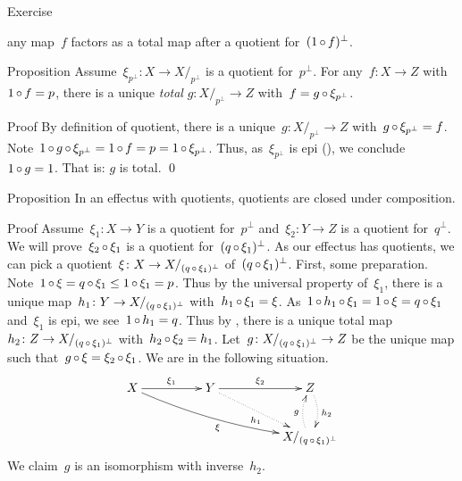 \documentclass[b]{subfiles}
\begin{document}
\begin{parsec}
\begin{point}{Exercise}
\begin{point}
    any map~$f$ factors as a total map after a quotient
    for~$(1\mathop{\circ} f)^\perp$.
\end{point}
\end{point}
\begin{point}{Proposition}%
Assume~$\xi_{p^\perp} \colon X \to X/_{p^\perp}$ is a quotient for~$p^\perp$.
For any~$f\colon X \to Z$
    with~$1 \mathop{\circ} f = p$,
    there is a unique \emph{total} $g\colon X/_{p^\perp} \to Z$
    with~$f = g \mathop{\circ} \xi_{p^\perp}$.
\begin{point}{Proof}%
By definition of quotient, there is a unique~$g\colon X/_{p^\perp} \to Z$
    with~$g \mathop{\circ} \xi_{p^\perp} = f$.
Note~$1 \mathop{\circ} g \mathop{\circ} \xi_{p^\perp} = 1 \mathop{\circ} f = p = 1 \mathop{\circ} \xi_{p^\perp}$.
Thus, as~$\xi_{p^\perp}$ is epi (),
    we conclude~$1 \mathop{\circ} g = 1$.
That is: $g$ is total. \qed
\end{point}
\end{point}
\begin{point}{Proposition}%
In an effectus with quotients,
    quotients are closed under composition.
\begin{point}{Proof}%
Assume~$\xi_1\colon X \to Y$ is a quotient for~$p^\perp$
    and~$\xi_2\colon Y \to Z$ is a quotient for~$q^\perp$.
We will prove~$\xi_2 \mathop{\circ} \xi_1$
    is a quotient for~$(q \mathop{\circ} \xi_1)^\perp$.
As our effectus has quotients,
    we can pick a quotient~$\xi \colon X \to X/_{(q \mathop{\circ} \xi_1)^\perp}$
        of~$(q \mathop{\circ} \xi_1)^\perp$.
First, some preparation.
Note~$1 \mathop{\circ} \xi = q \mathop{\circ} \xi_1 \leq 1 \mathop{\circ} \xi_1 = p$.
Thus by the universal property of~$\xi_1$,
there is a unique map~$h_1\colon Y \to X/_{(q \mathop{\circ} \xi_1)^\perp}$
        with~$h_1 \mathop{\circ} \xi_1 = \xi$.
As~$1 \mathop{\circ} h_1 \mathop{\circ} \xi_1 = 1 \mathop{\circ} \xi = q \mathop{\circ} \xi_1$
    and~$\xi_1$ is epi, we see~$1 \mathop{\circ} h_1 = q$.
Thus by ,
there is a unique total map~$h_2 \colon Z \to X/_{(q \mathop{\circ} \xi_1)^\perp}$
    with~$h_2 \mathop{\circ} \xi_2 = h_1$.
Let~$g\colon X/_{(q \mathop{\circ} \xi_1)^\perp} \to Z$
    be the unique map such that~$g \mathop{\circ} \xi = \xi_2 \mathop{\circ} \xi_1$.
We are in the following situation.
\begin{equation*}
    \xymatrix@C+2pc{
        X  \ar[r]^{\xi_1} \ar@/_/[rrd]_{\xi}
        & Y \ar[r]^{\xi_2} \ar@{.>}[rd]_{h_1}
        & Z \ar@{.>}@/^/[d]^{h_2} \\
        && X/_{(q \after \xi_1)^\perp} \ar@{.>}@/^/[u]^{g}
    }
\end{equation*}
We claim~$g$ is an isomorphism with inverse~$h_2$.

\end{point}
\end{point}
\end{parsec}
\end{document}
